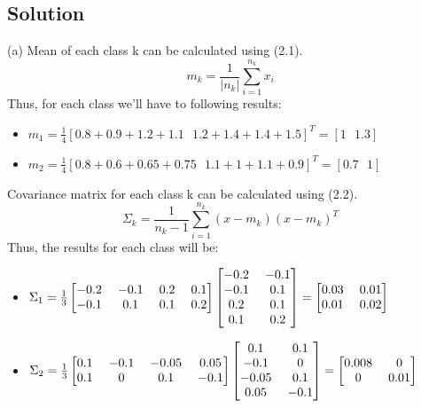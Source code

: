 \documentclass[12pt]{article}
\numberwithin{equation}{section}
\numberwithin{table}{section}
\numberwithin{figure}{section}
\begin{document}
\subsection*{Solution}
(a) Mean of each class k can be calculated using (2.1).
\begin{equation}
	m_k = \frac{1}{|n_k|}\sum_{i = 1}^{n_k} x_i
\end{equation}
Thus, for each class we'll have to following results:
\begin{itemize}
	\item $m_1 = \frac{1}{4}[0.8 + 0.9 + 1.2 + 1.1 \ \ \  1.2 + 1.4 + 1.4 + 1.5]^T = [1 \ \ \ 1.3]$
	\item $m_2 = \frac{1}{4}[0.8 + 0.6 + 0.65 + 0.75 \ \ \  1.1 + 1 + 1.1 + 0.9]^T = [0.7 \ \ \ 1]$
\end{itemize}
Covariance matrix for each class k can be calculated using (2.2).
\begin{equation}
	\Sigma_k = \frac{1}{n_k - 1}\sum_{i = 1}^{n_k} (x - m_k)(x - m_k)^T
\end{equation}
Thus, the results for each class will be:
\begin{itemize}
	\item $\Sigma_1 = \frac{1}{3}	\renewcommand\arraystretch{1}
	\setlength\arraycolsep{6.5pt}
	\begin{bmatrix}
	-0.2 & -0.1 & 0.2 & 0.1 \\
	-0.1 & 0.1 & 0.1 & 0.2 \\
	\end{bmatrix} 	\begin{bmatrix}
	-0.2 & -0.1\\
	-0.1 & 0.1\\
	0.2 & 0.1\\
	0.1 & 0.2\\
	\end{bmatrix} = \begin{bmatrix}
	0.03 & 0.01\\
	0.01 & 0.02\\
	\end{bmatrix} $
	
	
	\item 
	$\Sigma_2 = \frac{1}{3}	\renewcommand\arraystretch{1}
	\setlength\arraycolsep{6.5pt}
	\begin{bmatrix}
	0.1 & -0.1 & -0.05 & 0.05 \\
	0.1 & 0 & 0.1 & -0.1 \\
	\end{bmatrix} 	\begin{bmatrix}
	0.1 & 0.1\\
	-0.1 & 0\\
	-0.05 & 0.1\\
	0.05 & -0.1\\
	\end{bmatrix} = \begin{bmatrix}
	0.008 & 0\\
	0 & 0.01\\
	\end{bmatrix} $
\end{itemize}
\end{document}
